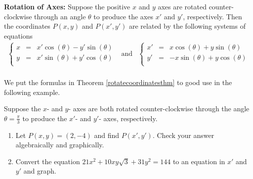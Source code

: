 \documentclass{ximera}
\begin{document}
\colorbox{ResultColor}{\bbm  

\begin{theorem} \label{rotatecoordinatesthm}  \textbf{Rotation of Axes:}  Suppose the positive $x$ and $y$ axes are rotated counter-clockwise through an angle $\theta$ to produce the axes $x'$ and $y'$, respectively.  Then the coordinates $P(x,y)$ and $P(x',y')$ are related by the following systems of equations
\[ \begin{array}{ccc}

\left\{  \begin{array}{rcl}x & = & x' \cos(\theta) - y' \sin(\theta) \\ y& = &  x'\sin(\theta) + y'\cos(\theta)  \\ \end{array} \right. &

\text{and}

&

\left\{ \begin{array}{rcl} x' & = & x \cos(\theta) + y \sin(\theta) \\ y' & = &  -x\sin(\theta) +y\cos(\theta)  \\ \end{array} \right.  

\\ \end{array} \]

\end{theorem}


\medskip

We put the formulas in  Theorem \ref{rotatecoordinatesthm} to good use in the following example.

\begin{example} \label{rotatedaxesex1}  Suppose the $x$- and $y$- axes are both rotated counter-clockwise through the angle $\theta = \frac{\pi}{3}$ to produce the $x'$- and $y'$- axes, respectively. 


\begin{enumerate}

\item  Let $P(x,y) = (2,-4)$ and find $P(x',y')$.  Check your answer algebraically and graphically.

\item  \label{rotatedellipseex} Convert the equation $21x^2+10xy\sqrt{3}+31y^2=144$ to an equation in $x'$ and $y'$ and graph.

\end{enumerate}


\end{example}}
\end{document}
